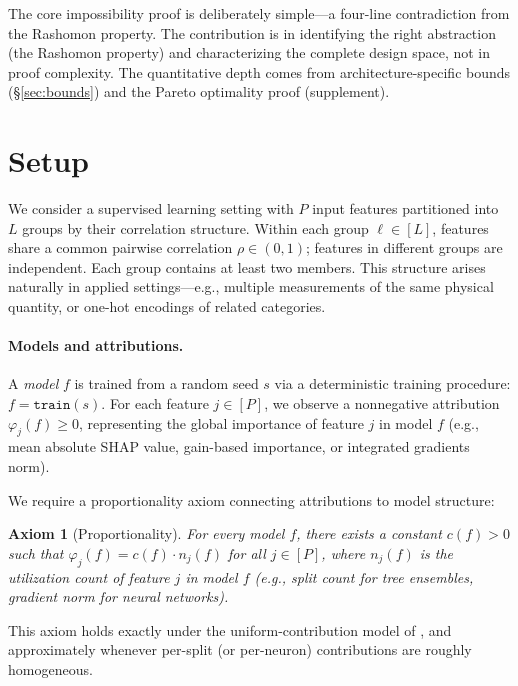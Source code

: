 \documentclass{article}
\newtheorem{axiom}{Axiom}
\begin{document}
The core impossibility proof is deliberately simple---a four-line contradiction from the Rashomon property.
The contribution is in identifying the right abstraction (the Rashomon property) and characterizing the complete design space, not in proof complexity.
The quantitative depth comes from architecture-specific bounds (\S\ref{sec:bounds}) and the Pareto optimality proof (supplement).

\section{Setup}
\label{sec:setup}

We consider a supervised learning setting with $P$ input features partitioned into $L$ groups by their correlation structure.
Within each group $\ell \in [L]$, features share a common pairwise correlation $\rho \in (0,1)$; features in different groups are independent.
Each group contains at least two members.
This structure arises naturally in applied settings---e.g., multiple measurements of the same physical quantity, or one-hot encodings of related categories.

\paragraph{Models and attributions.}
A \emph{model} $f$ is trained from a random seed $s$ via a deterministic training procedure: $f = \texttt{train}(s)$.
For each feature $j \in [P]$, we observe a nonneg\-ative attribution $\varphi_j(f) \geq 0$, representing the global importance of feature $j$ in model $f$ (e.g., mean absolute SHAP value, gain-based importance, or integrated gradients norm).

We require a proportionality axiom connecting attributions to model structure:

\begin{axiom}[Proportionality]
\label{ax:proportional}
For every model $f$, there exists a constant $c(f) > 0$ such that $\varphi_j(f) = c(f) \cdot n_j(f)$ for all $j \in [P]$, where $n_j(f)$ is the utilization count of feature $j$ in model $f$ (e.g., split count for tree ensembles, gradient norm for neural networks).
\end{axiom}

This axiom holds exactly under the uniform-contribution model of \citet{lundberg2017unified}, and approximately whenever per-split (or per-neuron) contributions are roughly homogeneous.

\end{document}
